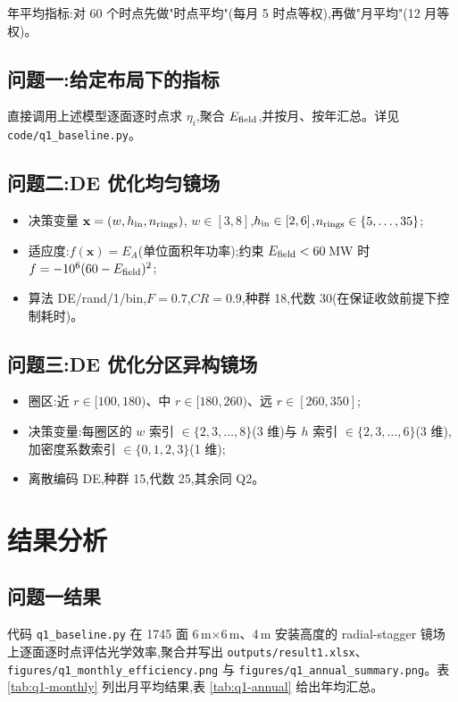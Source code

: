\documentclass[UTF8,a4paper,12pt]{ctexart}
\begin{document}
年平均指标:对 60 个时点先做"时点平均"(每月 5 时点等权),再做"月平均"(12 月等权)。

\subsection{问题一:给定布局下的指标}
直接调用上述模型逐面逐时点求 $\eta_i$,聚合 $E_{\rm field}$,并按月、按年汇总。详见 \texttt{code/q1\_baseline.py}。

\subsection{问题二:DE 优化均匀镜场}
\begin{itemize}[leftmargin=2em]
  \item 决策变量 $\mathbf{x}=(w, h_{\rm in}, n_{\rm rings})$, $w\in[3,8]$,$h_{\rm in}\in[2,6]$,$n_{\rm rings}\in\{5,\dots,35\}$;
  \item 适应度:$f(\mathbf{x})=E_A$(单位面积年功率);约束 $E_{\rm field}<60$\,MW 时 $f=-10^6(60-E_{\rm field})^2$;
  \item 算法 DE/rand/1/bin,$F=0.7$,$CR=0.9$,种群 18,代数 30(在保证收敛前提下控制耗时)。
\end{itemize}

\subsection{问题三:DE 优化分区异构镜场}
\begin{itemize}[leftmargin=2em]
  \item 圈区:近 $r\in[100,180)$、中 $r\in[180,260)$、远 $r\in[260,350]$;
  \item 决策变量:每圈区的 $w$ 索引 $\in\{2,3,\dots,8\}$(3 维)与 $h$ 索引 $\in\{2,3,\dots,6\}$(3 维),加密度系数索引 $\in\{0,1,2,3\}$(1 维);
  \item 离散编码 DE,种群 15,代数 25,其余同 Q2。
\end{itemize}

\section{结果分析}

\subsection{问题一结果}
代码 \texttt{q1\_baseline.py} 在 1745 面 6\,m$\times$6\,m、4\,m 安装高度的 radial-stagger 镜场上逐面逐时点评估光学效率,聚合并写出 \texttt{outputs/result1.xlsx}、\texttt{figures/q1\_monthly\_efficiency.png} 与 \texttt{figures/q1\_annual\_summary.png}。表 \ref{tab:q1-monthly} 列出月平均结果,表 \ref{tab:q1-annual} 给出年均汇总。
\end{document}
